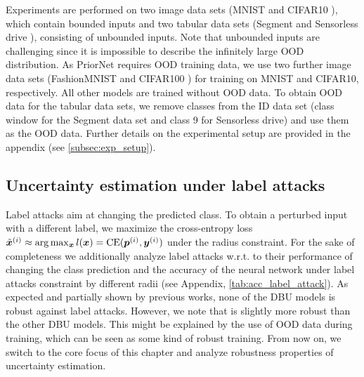 Experiments are performed on two image data sets (MNIST \citep{mnist} and CIFAR10 \citep{cifar10}), which contain bounded inputs and two tabular data sets (Segment \citep{uci_datasets} and Sensorless drive \citep{uci_datasets}), consisting of unbounded inputs. Note that unbounded inputs are challenging since it is impossible to describe the infinitely large OOD distribution. As PriorNet requires OOD training data, we use two further image data sets (FashionMNIST \citep{fashionmnist} and CIFAR100 \citep{cifar10}) for training on MNIST and CIFAR10, respectively. All other models are trained without OOD data. To obtain OOD data for the tabular data sets, we remove classes from the ID data set (class window for the Segment data set and class 9 for Sensorless drive) and use them as the OOD data. Further details on the experimental setup are provided in the appendix (see \cref{subsec:exp_setup}).



 


\subsection{Uncertainty estimation under label attacks}
\label{subsec:label_attacks}
%
Label attacks aim at changing the predicted class. To obtain a perturbed input with a different label, we maximize the cross-entropy loss $\tilde{{\bm{x}}}^{(i)} \approx \arg\max_{{\bm{x}}} l({\bm{x}}) = \text{CE}({\bm{p}}^{(i)}, {\bm{y}}^{(i)})$ under the radius constraint. For the sake of completeness we additionally analyze label attacks w.r.t. to their performance of changing the class prediction and the accuracy of the neural network under label attacks constraint by different radii (see Appendix, \cref{tab:acc_label_attack}). As expected and partially shown by previous works, none of the DBU models is robust against label attacks. %
However, we note that \PriorNet is slightly more robust than the other DBU models. This might be explained by the use of OOD data during training, which can be seen as some kind of robust training. 
%
From now on, we switch to the core focus of this chapter and analyze robustness properties of uncertainty estimation. 




